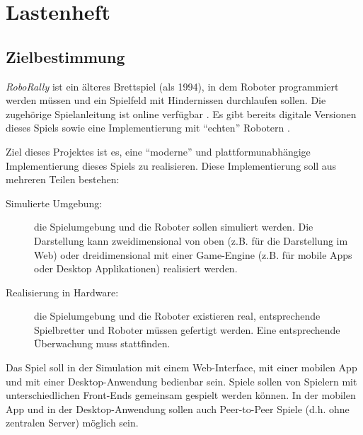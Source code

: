 
\part{Lastenheft}



\chapter{Zielbestimmung}

\emph{RoboRally} ist ein älteres Brettspiel (als 1994), in dem Roboter programmiert werden müssen und ein Spielfeld mit Hindernissen durchlaufen sollen.
Die zugehörige Spielanleitung ist online verfügbar \cite{roborally_rulebook}.
Es gibt bereits digitale Versionen dieses Spiels \cite{roborally_java} sowie eine Implementierung mit \enquote{echten} Robotern  \cite{make_roborally, roboruckus_git, roboruckus_web}.

Ziel dieses Projektes ist es, eine \enquote{moderne} und plattformunabhängige Implementierung dieses Spiels zu realisieren. Diese Implementierung soll aus mehreren Teilen bestehen:

\begin{description}
    \item[Simulierte Umgebung:] die Spielumgebung und die Roboter sollen simuliert werden.
    Die Darstellung kann zweidimensional von oben (z.B. für die Darstellung im Web) oder dreidimensional mit einer Game-Engine (z.B. für mobile Apps oder Desktop Applikationen) realisiert werden.

    \item[Realisierung in Hardware:] die Spielumgebung und die Roboter existieren real, entsprechende Spielbretter und Roboter müssen gefertigt werden.
    Eine entsprechende Überwachung muss stattfinden.
\end{description}

Das Spiel soll in der Simulation mit einem Web-Interface, mit einer mobilen App und mit einer Desktop-Anwendung bedienbar sein.
Spiele sollen von Spielern mit unterschiedlichen Front-Ends gemeinsam gespielt werden können.
In der mobilen App und in der Desktop-Anwendung sollen auch Peer-to-Peer Spiele (d.h. ohne zentralen Server) möglich sein.

